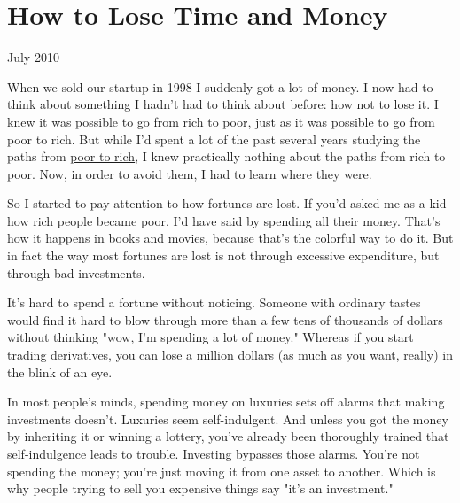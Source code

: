 \chapter{How to Lose Time and Money}


            
              
                

July 2010

When we sold our startup in 1998 I
                  suddenly got a lot of money. I now had to think about
                  something I hadn't had to think about before: how not to lose
                  it. I knew it was possible to go from rich to poor, just as it
                  was possible to go from poor to rich. But while I'd spent a
                  lot of the past several years studying the paths from
                  \href{http://www.paulgraham.com/wealth.html}{poor to rich}, I knew practically
                  nothing about the paths from rich to poor. Now, in order to
                  avoid them, I had to learn where they were.

So I
                  started to pay attention to how fortunes are lost. If you'd
                  asked me as a kid how rich people became poor, I'd have said
                  by spending all their money. That's how it happens in books
                  and movies, because that's the colorful way to do it. But in
                  fact the way most fortunes are lost is not through excessive
                  expenditure, but through bad investments.

It's hard
                  to spend a fortune without noticing. Someone with ordinary
                  tastes would find it hard to blow through more than a few tens
                  of thousands of dollars without thinking "wow, I'm spending a
                  lot of money." Whereas if you start trading derivatives, you
                  can lose a million dollars (as much as you want, really) in
                  the blink of an eye.

In most people's minds,
                  spending money on luxuries sets off alarms that making
                  investments doesn't. Luxuries seem self-indulgent. And unless
                  you got the money by inheriting it or winning a lottery,
                  you've already been thoroughly trained that self-indulgence
                  leads to trouble. Investing bypasses those alarms. You're not
                  spending the money; you're just moving it from one asset to
                  another. Which is why people trying to sell you expensive
                  things say "it's an investment."

